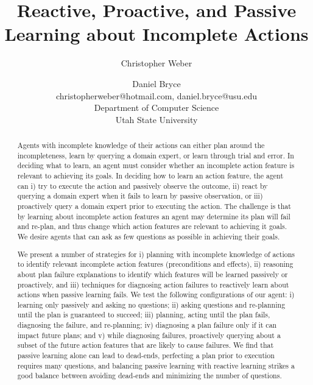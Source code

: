 \documentclass[letterpaper]{article}
\title{Reactive, Proactive, and Passive Learning about Incomplete Actions}
\author{Christopher Weber \and Daniel Bryce\\
christopherweber@hotmail.com, daniel.bryce@usu.edu\\
Department of Computer Science\\
Utah State University}
\begin{document}
\maketitle

\begin{abstract}
Agents with incomplete knowledge of their actions can either plan around the
incompleteness, learn by querying a domain expert, or learn through
trial and error.  In deciding what to learn, an agent must consider whether an
incomplete action feature is relevant to achieving its goals.  In deciding how
to learn an action feature, the agent can i) try to execute the action and
passively observe the outcome, ii) react by querying a domain expert when it
fails to learn by passive observation, or iii) proactively query a domain expert
prior to executing the action.  The challenge is that by learning about
incomplete action features an agent may determine its plan will fail and
re-plan, and thus change which action features are relevant to achieving it
goals.  We desire agents that can ask as few questions as
possible in achieving their goals.

We present a number of strategies for i) planning with incomplete knowledge of
actions to identify relevant incomplete action features (preconditions and
effects), ii) reasoning about plan failure explanations to identify which
features will be learned passively or proactively, and iii) techniques for
diagnosing action failures to reactively learn about actions when passive
learning fails.  We test the following configurations of our agent: i) learning
only passively and asking no questions; ii) asking questions and re-planning
until the plan is guaranteed to succeed; iii) planning, acting until the plan
fails, diagnosing the failure, and re-planning; iv) diagnosing a plan failure
only if it can impact future plans; and v) while diagnosing failures,
proactively querying about a subset of the future action features that are likely to cause failures. 
We find that passive learning alone can lead to dead-ends, perfecting a plan
prior to execution requires many questions, and balancing passive learning with
reactive learning strikes a good balance between avoiding dead-ends and
minimizing the number of questions.



\end{abstract}
\end{document}
